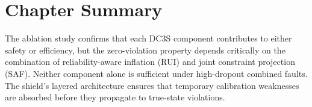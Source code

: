 \section{Chapter Summary}

The ablation study confirms that each DC3S component contributes to
either safety or efficiency, but the zero-violation property depends
critically on the combination of reliability-aware inflation (RUI) and
joint constraint projection (SAF).  Neither component alone is sufficient
under high-dropout combined faults.  The shield's layered architecture
ensures that temporary calibration weaknesses are absorbed before they
propagate to true-state violations.

